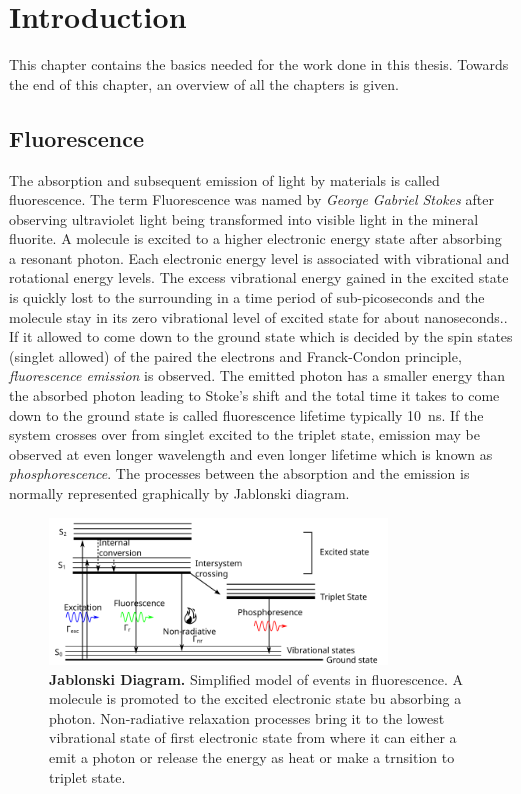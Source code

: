 \chapter{Introduction}
\label{chapter:intro}
\graphicspath{{./chapters/c1_intro/figures/}}
This chapter contains the basics needed for the work done in this thesis.
Towards the end of this chapter, an overview of all the chapters is given.

\section{Fluorescence}
The absorption and subsequent emission of light by materials is called fluorescence.
The term Fluorescence was named by \textit{George Gabriel Stokes} after observing ultraviolet light being transformed into visible light in the mineral fluorite.\cite{Stokes1852}
A molecule is excited to a higher electronic energy state after absorbing a resonant photon.
Each electronic energy level is associated with vibrational and rotational energy levels.
The excess vibrational energy gained in the excited state is quickly lost to the surrounding in a time period of sub-picoseconds and the molecule stay in its zero vibrational level of excited state for about nanoseconds..
If it allowed to come down to the ground state which is decided by the spin states (singlet allowed) of the paired the electrons and Franck-Condon principle, \textit{fluorescence emission} is observed.
The emitted photon has a smaller energy than the absorbed photon leading to Stoke's shift and the total time it takes to come down to the ground state is called fluorescence lifetime typically \SI{10}{\ns}.
If the system crosses over from singlet excited to the triplet state, emission may be observed at even longer wavelength and even longer lifetime which is known as \textit{phosphorescence}.
The processes between the absorption and the emission is normally represented graphically by Jablonski diagram.
\begin{figure}
	\centering
	\includegraphics[width=0.8\textwidth]{jablonski}
	\caption{\textbf{Jablonski Diagram.} Simplified model of events in fluorescence. A molecule is promoted to the excited electronic state bu absorbing a photon. Non-radiative relaxation processes bring it to the lowest vibrational state of first electronic state from where it can either a emit a photon or release the energy as heat or make a trnsition to triplet state.}
	\label{fig:jablonski}
\end{figure}


